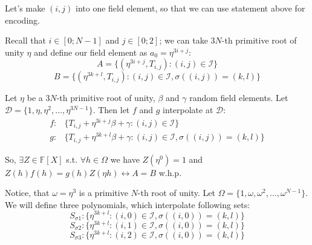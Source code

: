 \documentclass{zkdl-presentation-template}
\begin{document}
    \begin{frame}
        Let's make $(i, j)$ into one field element, so that we can use statement above for encoding.
        
        Recall that $i \in [0; N-1]$ and $j \in [0; 2]$; we can take $3N$-th primitive root of unity $\eta$ and define our field element as \(a_0 = \eta^{3i + j}\):
        \[A = \{(\eta^{3i+j}, T_{i,j}) : (i, j) \in \mathcal{I}\}\]
        \[B = \{(\eta^{3k+l}, T_{i,j}) : (i, j) \in \mathcal{I}, \sigma((i, j)) = (k, l)\}\]        
    \end{frame}

    \begin{frame}
        Let $\eta$ be a $3N$-th primitive root of unity, $\beta$ and $\gamma$ random field elements. Let $\mathcal{D} = \{1, \eta, \eta^2, \ldots, \eta^{3N-1}\}$. Then let $f$ and $g$ interpolate at $\mathcal{D}$:
        \begin{align*}
            f: & \{T_{i,j} + \eta^{3i+j}\beta + \gamma : (i, j) \in \mathcal{I}\} \\
            g: & \{T_{i,j} + \eta^{3k+l}\beta + \gamma : (i, j) \in \mathcal{I}, \sigma((i, j)) = (k, l)\}
        \end{align*}
        
        So, $\exists Z \in \mathbb{F}[X]$ s.t. $\forall h \in \Omega$ we have $Z(\eta^{0}) = 1$ and $Z(h)f(h) = g(h)Z(\eta h) \leftrightarrow A = B$ w.h.p.        
    \end{frame}

    \begin{frame}
        Notice, that $\omega = \eta^3$ is a primitive $N$-th root of unity. Let \(\Omega = \{1, \omega, \omega^2, \ldots, \omega^{N-1}\}\). 
        We will define three polynomials, which interpolate following sets:
        \[S_{\sigma 1}: \{\eta^{3k+l} : (i, 0) \in \mathcal{I}, \sigma((i, 0)) = (k, l)\}\]
        \[S_{\sigma 2}: \{\eta^{3k+l} : (i, 1) \in \mathcal{I}, \sigma((i, 0)) = (k, l)\}\]
        \[S_{\sigma 3}: \{\eta^{3k+l} : (i, 2) \in \mathcal{I}, \sigma((i, 0)) = (k, l)\}\]
    \end{frame}
    
\end{document}
